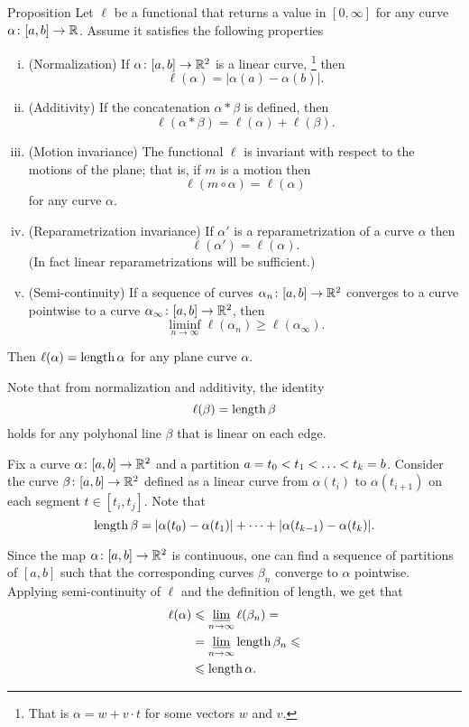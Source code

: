 \begin{thm}{Proposition}\label{prop:length-axioms}
Let $\ell$ be a functional that returns a value in $[0,\infty]$ for any curve $\alpha\colon[a,b]\to\mathbb{R}$.
Assume it satisfies the following properties
\begin{enumerate}[(i)]
\item\label{Normalization} (Normalization) If $\alpha\colon[a,b]\to \mathbb{R}^2$ is a linear curve,%
\footnote{That is $\alpha=w+v\cdot t$ for some vectors $w$ and $v$.} then
\[\ell(\alpha)=|\alpha(a)-\alpha(b)|.\]
\item\label{Additivity} (Additivity) If the concatenation $\alpha*\beta$ is defined, then
\[\ell(\alpha*\beta)=\ell(\alpha)+\ell(\beta).\]
\item\label{Motion invariance} (Motion invariance) The functional $\ell$ is invariant with respect to the motions of the plane; that is, if $m$ is a motion then 
\[\ell(m\circ\alpha)=\ell(\alpha)\]
for any curve $\alpha$.
\item\label{Reparametrization invariance} (Reparametrization invariance) If $\alpha'$ is a reparametrization of a curve $\alpha$ then
\[\ell(\alpha')=\ell(\alpha).\]
(In fact linear reparametrizations will be sufficient.)
\item\label{Semi-continuity} (Semi-continuity) If a sequence of curves $\alpha_n\colon[a,b]\to \mathbb{R}^2$ converges to a curve pointwise to a curve $\alpha_\infty\colon[a,b]\to \mathbb{R}^2$, then 
\[\liminf_{n\to\infty} \ell(\alpha_n) \ge \ell(\alpha_\infty).\]
\end{enumerate}
Then $\ell(\alpha)=\mathop{\rm length}\nolimits \alpha$ for any plane curve $\alpha$.

\end{thm}

Note that from normalization and additivity, the identity 
\[\ell(\beta)=\mathop{\rm length}\nolimits \beta\]
holds for any polyhonal line $\beta$ that is linear on each edge.

Fix a curve $\alpha\colon[a,b]\to \mathbb{R}^2$ and a partition $a=t_0\z<t_1\z<\z\dots\z<t_k=b$. 
Consider the curve $\beta\colon[a,b]\to \mathbb{R}^2$ defined as a linear curve from $\alpha(t_i)$ to $\alpha(t_{i+1})$  on each segment $t\in[t_i,t_j]$.
Note that 
\[\mathop{\rm length}\nolimits\beta=|\alpha(t_0)-\alpha(t_1)|+\dots+|\alpha(t_{k-1})-\alpha(t_k)|.\]

Since the map  $\alpha\colon[a,b]\to \mathbb{R}^2$ is continuous,
one can find a sequence of partitions of $[a,b]$ such that the corresponding curves $\beta_n$ converge to $\alpha$ pointwise.
Applying semi-continuity of $\ell$ and the definition of length, we get that 
\begin{align*}
\ell(\alpha)&\leqslant \varliminf_{n\to\infty}\ell(\beta_n)=
\\
&=\varliminf_{n\to\infty}\mathop{\rm length}\nolimits\beta_n\leqslant
\\
&\leqslant\mathop{\rm length}\nolimits \alpha.
\end{align*}

